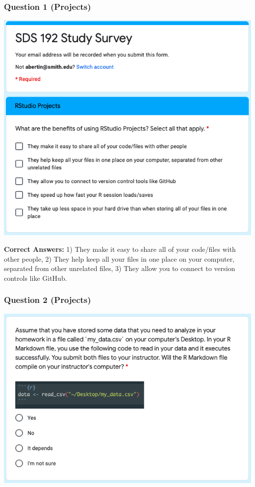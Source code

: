 \documentclass[12pt,twoside]{reedthesis}
\begin{document}
\hypertarget{question-1-projects}{%
\subsubsection{Question 1 (Projects)}\label{question-1-projects}}

\includegraphics[width=0.8\linewidth]{figure/appendix/test-1}

\textbf{Correct Answers:} 1) They make it easy to share all of your code/files with other people, 2) They help keep all your files in one place on your computer, separated from other unrelated files, 3) They allow you to connect to version controls like GitHub.

\hypertarget{question-2-projects}{%
\subsubsection{Question 2 (Projects)}\label{question-2-projects}}

\includegraphics[width=0.8\linewidth]{figure/appendix/test-2}
\end{document}
